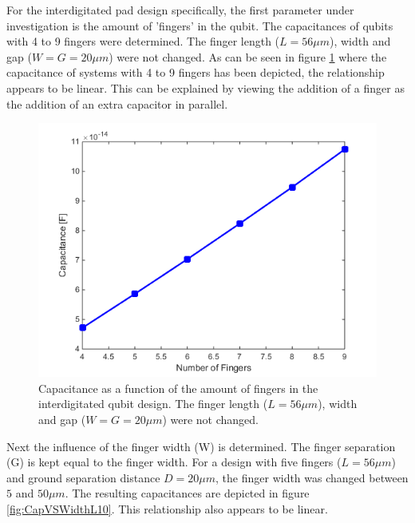 For the interdigitated pad design specifically, the first parameter under investigation is the amount of 'fingers' in the  qubit. The capacitances of qubits with 4 to 9 fingers were determined. The finger length (\(L=56\mu m\)), width and gap (\(W=G=20\mu m\)) were not changed.
As can be seen in figure \ref{fig:CapVSFingers} where the capacitance of systems with 4 to 9 fingers has been depicted, the relationship appears to be linear. This can be explained by viewing the addition of a finger as the addition of an extra capacitor in parallel.

\begin{figure}
	\centering
	\includegraphics[scale = 0.7]{Figures/Capacitance_Plots/CapVSFingers.png}
	\caption{Capacitance as a function of the amount of fingers in the interdigitated qubit design. The finger length (\(L=56\mu m\)), width and gap (\(W=G=20\mu m\)) were not changed.}
	\label{fig:CapVSFingers}
\end{figure}

Next the influence of the finger width (W) is determined. The finger separation (G) is kept equal to the finger width. For a design with five fingers (\(L=56\mu m\)) and ground separation distance \(D = 20\mu m\), the finger width was changed between \(5\) and \(50\mu m\). The resulting capacitances are depicted in figure \ref{fig:CapVSWidthL10}. This relationship also appears to be linear.

